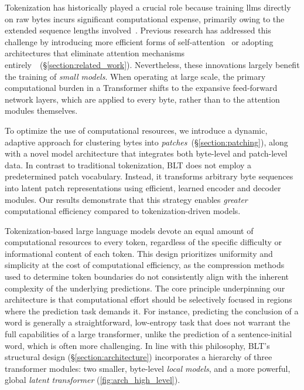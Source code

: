 Tokenization has historically played a crucial role because training llms directly on raw bytes incurs significant computational expense, primarily owing to the extended sequence lengths involved~\citep{xue2022byt5}. Previous research has addressed this challenge by introducing more efficient forms of self-attention~\citep{el2020characterbert, clark2022canine} or adopting architectures that eliminate attention mechanisms entirely~\citep{wang2024mambabyte}~(\S\ref{section:related_work}). Nevertheless, these innovations largely benefit the training of \textit{small models}. When operating at large scale, the primary computational burden in a Transformer shifts to the expansive feed-forward network layers, which are applied to every byte, rather than to the attention modules themselves.

To optimize the use of computational resources, we introduce a dynamic, adaptive approach for clustering bytes into \textit{patches}~(\S\ref{section:patching}), along with a novel model architecture that integrates both byte-level and patch-level data. In contrast to traditional tokenization, {\textsc BLT} does not employ a predetermined patch vocabulary. Instead, it transforms arbitrary byte sequences into latent patch representations using efficient, learned encoder and decoder modules. Our results demonstrate that this strategy enables \textit{greater} computational efficiency compared to tokenization-driven models.

Tokenization-based large language models devote an equal amount of computational resources to every token, regardless of the specific difficulty or informational content of each token. This design prioritizes uniformity and simplicity at the cost of computational efficiency, as the compression methods used to determine token boundaries do not consistently align with the inherent complexity of the underlying predictions. The core principle underpinning our architecture is that computational effort should be selectively focused in regions where the prediction task demands it. For instance, predicting the conclusion of a word is generally a straightforward, low-entropy task that does not warrant the full capabilities of a large transformer, unlike the prediction of a sentence-initial word, which is often more challenging. In line with this philosophy, {\textsc BLT}'s structural design (\S\ref{section:architecture}) incorporates a hierarchy of three transformer modules: two smaller, byte-level \textit{local models}, and a more powerful, global \textit{latent transformer} (\autoref{fig:arch_high_level}). 

